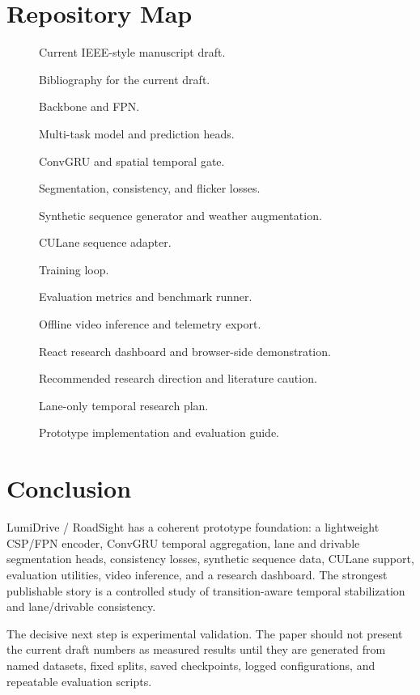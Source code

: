 \documentclass[11pt,a4paper]{article}
\begin{document}
\section{Repository Map}

\begin{description}
\item[] Current IEEE-style manuscript draft.
\item[] Bibliography for the current draft.
\item[] Backbone and FPN.
\item[] Multi-task model and prediction heads.
\item[] ConvGRU and spatial temporal gate.
\item[] Segmentation, consistency, and flicker losses.
\item[] Synthetic sequence generator and weather augmentation.
\item[] CULane sequence adapter.
\item[] Training loop.
\item[] Evaluation metrics and benchmark runner.
\item[] Offline video inference and telemetry export.
\item[] React research dashboard and browser-side demonstration.
\item[] Recommended research direction and literature caution.
\item[] Lane-only temporal research plan.
\item[] Prototype implementation and evaluation guide.
\end{description}

\section{Conclusion}

LumiDrive / RoadSight has a coherent prototype foundation: a lightweight CSP/FPN encoder, ConvGRU temporal aggregation, lane and drivable segmentation heads, consistency losses, synthetic sequence data, CULane support, evaluation utilities, video inference, and a research dashboard. The strongest publishable story is a controlled study of transition-aware temporal stabilization and lane/drivable consistency.

The decisive next step is experimental validation. The paper should not present the current draft numbers as measured results until they are generated from named datasets, fixed splits, saved checkpoints, logged configurations, and repeatable evaluation scripts.



\end{document}
